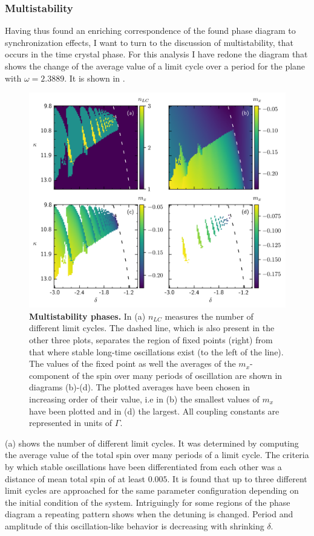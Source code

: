 \subsubsection{Multistability}\label{sec:multistability}
Having thus found an enriching correspondence of the found phase diagram to synchronization effects, I want to turn to the discussion of multistability, that occurs in the time crystal phase. For this analysis I have redone the diagram that shows the change of the average value of a limit cycle over a period for the plane with $\omega=2.3889$. It is shown in .\newpage
\begin{figure}[H]
    \vspace*{-0.45cm}
    \hspace*{-1.2cm}
    \includegraphics{pictures/limit_cycle_mean.png}
    \caption{\textbf{Multistability phases.} In (a) $n_{LC}$ measures the number of different limit cycles. The dashed line, which is also present in the other three plots, separates the region of fixed points (right) from that where stable long-time oscillations exist (to the left of the line). The values of the fixed point as well the averages of the $m_x$-component of the spin over many periods of oscillation are shown in diagrams (b)-(d). The plotted averages have been chosen in increasing order of their value, i.e in (b) the smallest values of $m_x$ have been plotted and in (d) the largest. All coupling constants are represented in units of $\Gamma$.}
    \label{fig:precise_multistab2d}
\end{figure}
(a) shows the number of different limit cycles. It was determined by computing the average value of the total spin over many periods of a limit cycle. The criteria by which stable oscillations have been differentiated from each other was a distance of mean total spin of at least $0.005$. It is found that up to three different limit cycles are approached for the same parameter configuration depending on the initial condition of the system. Intriguingly for some regions of the phase diagram a repeating pattern shows when the detuning is changed. Period and amplitude of this oscillation-like behavior is decreasing with shrinking $\delta$. 

